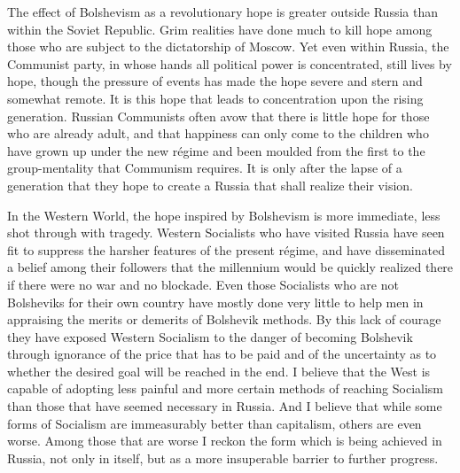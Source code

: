 The effect of Bolshevism as a revolutionary hope is greater outside Russia than within the Soviet Republic. Grim realities have done much to kill hope among those who are subject to the dictatorship of Moscow. Yet even within Russia, the Communist party, in whose hands all political power is concentrated, still lives by hope, though the pressure of events has made the hope severe and stern and somewhat remote. It is this hope that leads to concentration upon the rising generation. Russian Communists often avow that there is little hope for those who are already adult, and that happiness can only come to the children who have grown up under the new régime and been moulded from the first to the group-mentality that Communism requires. It is only after the lapse of a generation that they hope to create a Russia that shall realize their vision.

In the Western World, the hope inspired by Bolshevism is more immediate, less shot through with tragedy. Western Socialists who have visited Russia have seen fit to suppress the harsher features of the present régime, and have disseminated a belief among their followers that the millennium would be quickly realized there if there were no war and no blockade. Even those Socialists who are not Bolsheviks for their own country have mostly done very little to help men in appraising the merits or demerits of Bolshevik methods. By this lack of courage they have exposed Western Socialism to the danger of becoming Bolshevik through ignorance of the price that has to be paid and of the uncertainty as to whether the desired goal will be reached in the end. I believe that the West is capable of adopting less painful and more certain methods of reaching Socialism than those that have seemed necessary in Russia. And I believe that while some forms of Socialism are immeasurably better than capitalism, others are even worse. Among those that are worse I reckon the form which is being achieved in Russia, not only in itself, but as a more insuperable barrier to further progress.

